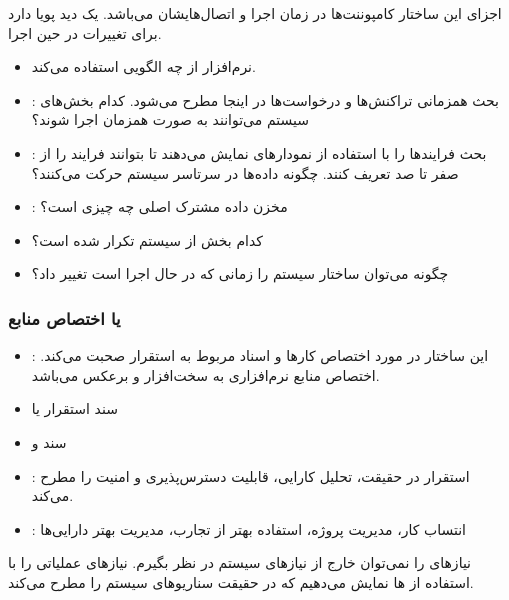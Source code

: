 اجزای این ساختار کامپوننت‌ها در زمان اجرا و اتصال‌هایشان می‌باشد. یک دید پویا
دارد برای تغییرات در حین اجرا.

\begin{itemize}
    \item {} نرم‌افزار از چه الگویی استفاده می‌کند.
    \item {}: بحث همزمانی تراکنش‌ها و درخواست‌ها در اینجا مطرح
    می‌شود. کدام بخش‌های سیستم می‌توانند به صورت همزمان اجرا شوند؟
    \item {}: بحث فرایند‌ها را با استفاده از نمودار‌های 
    نمایش می‌دهند تا بتوانند فرایند را از صفر تا صد تعریف کنند. چگونه داده‌ها در
    سرتاسر سیستم حرکت می‌کنند؟
    \item {}: مخزن داده مشترک اصلی چه چیزی است؟
    \item کدام بخش از سیستم تکرار شده است؟
    \item چگونه می‌توان ساختار سیستم را زمانی که در حال اجرا است تغییر داد؟
\end{itemize}

\subsubsection{ یا اختصاص منابع}

\begin{itemize}
    \item {}: این ساختار در مورد اختصاص کار‌ها و اسناد مربوط
    به استقرار صحبت می‌کند. اختصاص منابع نرم‌افزاری به سخت‌افزار و برعکس
    می‌باشد.
    \item سند استقرار یا 
    \item سند  و 
    \item {}: استقرار در حقیقت، تحلیل کارایی، قابلیت دسترس‌پذیری و
    امنیت را مطرح می‌کند.
    \item {}: انتساب کار، مدیریت پروژه، استفاده بهتر از تجارب،
    مدیریت بهتر دارایی‌ها
\end{itemize}

نیاز‌های  را نمی‌توان خارج از نیاز‌های  سیستم در نظر بگیرم.
نیاز‌های عملیاتی را با استفاده از ها نمایش می‌دهیم که در حقیقت
سناریو‌های سیستم را مطرح می‌کند.